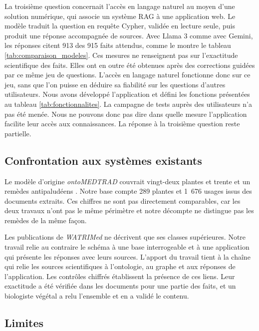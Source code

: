 La troisième question concernait l'accès en langage naturel au moyen d'une solution numérique, qui associe un système RAG à une application web. Le modèle traduit la question en requête Cypher, validée en lecture seule, puis produit une réponse accompagnée de sources. Avec Llama 3 comme avec Gemini, les réponses citent 913 des 915 faits attendus, comme le montre le tableau \ref{tab:comparaison_modeles}. Ces mesures ne renseignent pas sur l'exactitude scientifique des faits. Elles ont en outre été obtenues après des corrections guidées par ce même jeu de questions. L'accès en langage naturel fonctionne donc sur ce jeu, sans que l'on puisse en déduire sa fiabilité sur les questions d'autres utilisateurs. Nous avons développé l'application et défini les fonctions présentées au tableau \ref{tab:fonctionnalites}. La campagne de tests auprès des utilisateurs n'a pas été menée. Nous ne pouvons donc pas dire dans quelle mesure l'application facilite leur accès aux connaissances. La réponse à la troisième question reste partielle.

\subsection{Confrontation aux systèmes existants}
\label{subsec:discussion_existant}

Le modèle d'origine \textit{ontoMEDTRAD} couvrait vingt-deux plantes et trente et un remèdes antipaludéens \cite{kouame_visual_2020}. Notre base compte 289 plantes et 1~676 usages issus des documents extraits. Ces chiffres ne sont pas directement comparables, car les deux travaux n'ont pas le même périmètre et notre décompte ne distingue pas les remèdes de la même façon.

Les publications de \textit{WATRIMed} ne décrivent que ses classes supérieures. Notre travail relie au contraire le schéma à une base interrogeable et à une application qui présente les réponses avec leurs sources. L'apport du travail tient à la chaîne qui relie les sources scientifiques à l'ontologie, au graphe et aux réponses de l'application. Les contrôles chiffrés établissent la présence de ces liens. Leur exactitude a été vérifiée dans les documents pour une partie des faits, et un biologiste végétal a relu l'ensemble et en a validé le contenu.

\subsection{Limites}
\label{subsec:discussion_limites}


